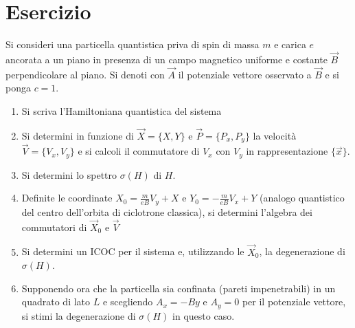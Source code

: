 \documentclass[../../FisicaTeorica.tex]{subfiles}
\begin{document}
\begin{comment}
\section{Lezione ?:\\ \large{}}
\vspace{-1em}
\begin{center}
    \small{(6/12/2018)}
\end{center}

Alcuni esercizi di esami scorsi sono disponibili a \url{https://www2.pd.infn.it/~march/} nella cartella \textit{Meccanica Quantistica}.

\end{comment}

\section{Esercizio \theEsercizio}
Si consideri una particella quantistica priva di spin di massa $m$ e carica $e$ ancorata a un piano in presenza di un campo magnetico uniforme e costante $\vec{B}$ perpendicolare al piano. Si denoti con $\vec{A}$ il potenziale vettore osservato a $\vec{B}$ e si ponga $c=1$. 
\begin{enumerate}
\item Si scriva l'Hamiltoniana quantistica del sistema
\item Si determini in funzione di $\vec{X}=\{X,Y\}$ e $\vec{P}= \{P_x, P_y\}$ la velocità $\vec{V}=\{V_x, V_y\}$ e si calcoli il commutatore di $V_x$ con $V_y$ in rappresentazione $\{\vec{x}\}$.
\item Si determini lo spettro $\sigma(H)$ di $H$.
\item Definite le coordinate $X_0=\frac{m}{eB}V_y + X$ e $Y_0 = -\frac{m}{eB}V_x + Y$ (analogo quantistico del centro dell'orbita di ciclotrone classica), si determini l'algebra dei commutatori di $\vec{X}_0$ e $\vec{V}$
\item Si determini un ICOC per il sistema e, utilizzando le $\vec{X}_0$, la degenerazione di $\sigma(H)$.
\item Supponendo ora che la particella sia confinata (pareti impenetrabili) in un quadrato di lato $L$ e scegliendo
$A_x = -B y$ e $A_y=0$ per il potenziale vettore, si stimi la degenerazione di $\sigma(H)$ in questo caso.
\end{enumerate}
\end{document}
